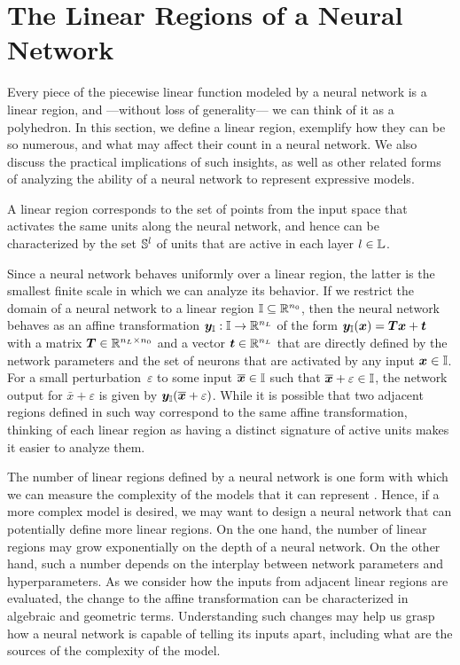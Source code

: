 
\section{The Linear Regions of a Neural Network}\label{sec:LR}

Every piece of the piecewise linear function modeled by a neural network is a linear region, 
and ---without loss of generality--- we can think of it as a polyhedron. 
In this section, we define a linear region, exemplify how they can be so numerous, and what may affect their count in a neural network. 
We also discuss the practical implications of such insights, as well as other related forms of analyzing the ability of a neural network to represent expressive models. 


\begin{definition}
A linear region corresponds to the set of points from the input space that activates the same units along the neural network, 
and hence can be characterized by the set ${\mathbb{S}}^l$ of units that are active in each layer $l \in {\mathbb{L}}$.
\end{definition}

Since a neural network behaves uniformly over a linear region, the latter is the smallest finite scale in which we can analyze its behavior. 
If we restrict the domain of a neural network to a linear region ${\mathbb{I}} \subseteq \mathbb{R}^{n_0}$, then the neural network behaves as an affine transformation ${\bm{y}}_{\mathbb{I}} : {\mathbb{I}} \rightarrow \mathbb{R}^{n_{L}}$ of the form ${\bm{y}}_{\mathbb{I}}({\bm{x}}) = {\bm{T}} {\bm{x}} + {\bm{t}}$ with a matrix ${\bm{T}} \in \mathbb{R}^{n_{L} \times n_0}$ and a vector ${\bm{t}} \in \mathbb{R}^{n_{L}}$ that are directly defined by the network parameters and the set of neurons that are activated by any input ${\bm{x}} \in {\mathbb{I}}$. 
For a small perturbation~$\varepsilon$ to some input $\overline{{\bm{x}}} \in {\mathbb{I}}$ such that $\overline{{\bm{x}}}+\varepsilon \in {\mathbb{I}}$, 
the network output for $\bar{x}+\varepsilon$ is given by ${\bm{y}}_{\mathbb{I}}(\overline{{\bm{x}}}+\varepsilon)$. 
%
While it is possible that two adjacent regions defined in such way correspond to the same affine transformation, 
thinking of each linear region as having a distinct signature of active units makes it easier to analyze them.

The number of linear regions defined by a neural network is one form with which we can measure the complexity of the models that it can represent \citep{DeepArchitectures}. 
Hence, if a more complex model is desired, we may want to design a neural network that can potentially define more linear regions. %
On the one hand, the number of linear regions may grow exponentially on the depth of a neural network. 
On the other hand, such a number depends on the interplay between network parameters and hyperparameters. 
As we consider how the inputs from adjacent linear regions are evaluated, 
the change to the affine transformation can be characterized in algebraic and geometric terms. 
Understanding such changes may help us grasp how a neural network is capable of telling its inputs apart, including what are the sources of the complexity of the model. 

